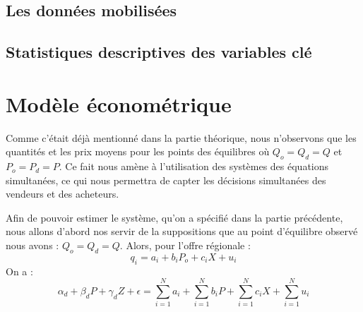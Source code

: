 \documentclass[11pt, a4paper]{article}
\begin{document}
\subsection*{Les données mobilisées}

\subsection*{Statistiques descriptives des variables clé}

\section*{Modèle économétrique}
Comme c'était déjà mentionné dans la partie théorique, nous n'observons que les quantités et les prix moyens pour les points des équilibres où $Q_o = Q_d = Q$ et $P_o = P_d = P$.
Ce fait nous amène à l'utilisation des systèmes des équations simultanées, ce qui nous permettra de capter les décisions simultanées des vendeurs et des acheteurs. 
\par
Afin de pouvoir estimer le système, qu'on a spécifié dans la partie précédente, nous allons d'abord nos servir de la suppositions que au point d'équilibre observé nous avons : $Q_o = Q_d = Q$.
Alors, pour l'offre régionale :
\begin{equation}
    q_i = a_i + b_i P_o + c_i X + u_i
\end{equation} 
On a :
\begin{equation}
    \alpha_d + \beta_d P + \gamma_d Z + \epsilon = 
        \sum_{i = 1}^{N} a_i + \sum_{i = 1}^{N} b_i P + \sum_{i = 1}^{N} c_i X + \sum_{i = 1}^{N} u_i
\end{equation}
\end{document}

